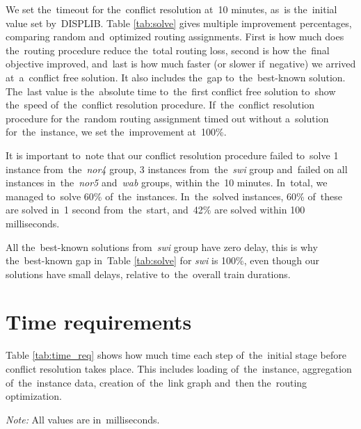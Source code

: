 We set the~timeout for the~conflict resolution at~10 minutes, as~is the~initial value set by~DISPLIB. Table \ref{tab:solve} gives multiple improvement percentages, comparing random and~optimized routing assignments. First is how much does the~routing procedure reduce the~total routing loss, second is how the~final objective improved, and~last is how much faster (or slower if~negative) we arrived at~a~conflict free solution. It also includes the~gap to~the~best-known solution. The~last value is the~absolute time to~the~first conflict free solution to~show the~speed of~the~conflict resolution procedure. If~the~conflict resolution procedure for the~random routing assignment timed out without a~solution for~the~instance, we set the~improvement at~100\%.

\begin{table}[htbp!]
\begin{center}
\caption{Routing and~conflict resolution}
\label{tab:solve}

\end{center}
\end{table}

It is important to~note that our conflict resolution procedure failed to~solve 1 instance from~the~\emph{nor4} group, 3 instances from~the~\emph{swi} group and~failed on all instances in~the~\emph{nor5} and~\emph{wab} groups, within the~10 minutes. In~total, we managed to~solve 60\% of~the~instances. In~the~solved instances, 60\% of~these are solved in~1 second from~the~start, and~42\% are solved within 100 milliseconds.

\begin{remark}
All the~best-known solutions from~\emph{swi} group have zero delay, this is why the~best-known gap in~Table \ref{tab:solve} for \emph{swi} is 100\%, even though our solutions have small delays, relative to~the~overall train durations.	
\end{remark}

\section{Time requirements}
Table \ref{tab:time_req} shows how much time each step of~the~initial stage before conflict resolution takes place. This includes loading of~the~instance, aggregation of~the~instance data, creation of~the~link graph and~then the~routing optimization.

\begin{table}[htbp!]
\begin{center}
\caption{Time requirements for initial stage}
\label{tab:time_req}

\end{center}
\textit{Note:} All values are in~milliseconds.
\end{table}